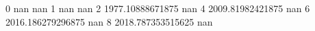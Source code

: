 0 nan nan
1 nan nan
2 1977.10888671875 nan
4 2009.81982421875 nan
6 2016.186279296875 nan
8 2018.787353515625 nan
